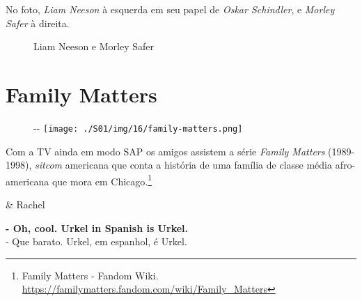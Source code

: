 No foto, \emph{Liam Neeson} à esquerda em seu papel de \emph{Oskar
Schindler}, e \emph{Morley Safer} à direita.

\begin{figure}
  \centering
    \caption{Liam Neeson e Morley Safer\label{fig:liam-neeson-e-morley-safer}}
\end{figure}

\hypertarget{family-matters}{%
\section{Family Matters}\label{family-matters}}

\begin{figure}[!ht]
  \begin{adjustwidth}{-\oddsidemargin-1in}{-\rightmargin}
    \centering
    \texttt{[image: ./S01/img/16/family-matters.png]}
  \end{adjustwidth}
\end{figure}

Com a TV ainda em modo SAP os amigos assistem a série \emph{Family
Matters} (1989-1998), \emph{sitcom} americana que conta a história de
uma família de classe média afro-americana que mora em
Chicago.\footnote{\sloppy Family Matters - Fandom Wiki. \url{https://familymatters.fandom.com/wiki/Family_Matters}}

\begin{tcolorbox}[enhanced,center upper,
    drop fuzzy shadow southeast, boxrule=0.3pt,
    lower separated=false, breakable,
    colframe=black!30!dialogoBorder,colback=white]
\begin{minipage}[c]{0.16\linewidth}
   & \centering \scriptsize{Rachel}
\end{minipage}
\hfill
\begin{minipage}[c]{0.8\linewidth}
  \textbf{- Oh, cool. Urkel in Spanish is Urkel.}\\
  - Que barato. Urkel, em espanhol, é Urkel.
\end{minipage}
\end{tcolorbox}

